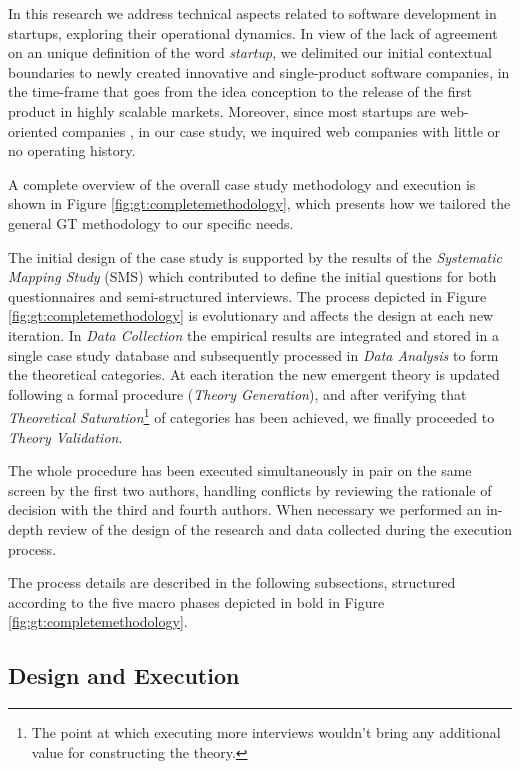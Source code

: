 \documentclass[12pt,journal,compsoc]{../sty/IEEEtran}
\begin{document}
In this research we address technical aspects related to software development
in startups, exploring their operational dynamics. In view of the lack of
agreement on an unique definition of the word \textit{startup}, we delimited our
initial contextual boundaries to newly created innovative and single-product
software companies, in the time-frame that goes from the idea conception to the
release of the first product in highly scalable markets. Moreover, since most
startups are web-oriented companies \cite{tc-webstartups-link, Allen2003}, in
our case study, we inquired web companies with little or no operating history.

A complete overview of the overall case study methodology and execution is
shown in Figure \ref{fig:gt:completemethodology}, which presents how we tailored
the general GT methodology to our specific needs.


The initial design of the case study is supported by the results of the
\textit{Systematic Mapping Study} (SMS) \cite{SMS} which contributed to define
the initial questions for both questionnaires and semi-structured interviews.
The process depicted in Figure \ref{fig:gt:completemethodology} is evolutionary
and affects the design at each new iteration. In \textit{Data Collection} the
empirical results are integrated and stored in a single case study database and
subsequently processed in \textit{Data Analysis} to form the theoretical
categories.  At each iteration the new emergent theory is updated following a
formal procedure (\textit{Theory Generation}), and after verifying that
\textit{Theoretical Saturation}\footnote{The point at which executing more
interviews wouldn't bring any additional value for constructing the theory.} of
categories has been achieved, we finally proceeded to \textit{Theory
Validation}.

The whole procedure has been executed simultaneously in pair on the same screen
by the first two authors, handling conflicts by reviewing the rationale of
decision with the third and fourth authors. When necessary we performed an  in-
depth review of the design of the research and data collected during the
execution process.

The process details are described in the following subsections, structured
according to the five macro phases depicted in bold in Figure
\ref{fig:gt:completemethodology}.



\subsection{Design and Execution} \label{desex}
\end{document}
